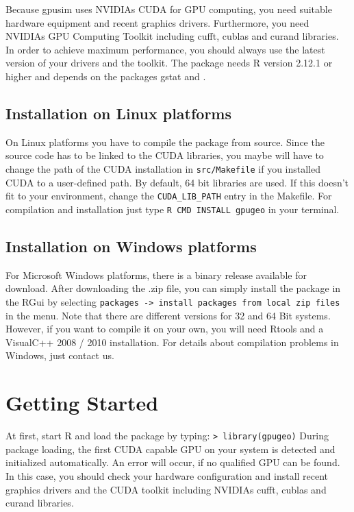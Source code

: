\documentclass[12pt,oneside,a4paper]{article}
\begin{document}
Because gpusim uses NVIDIAs CUDA for GPU computing, you need suitable hardware equipment and recent graphics drivers. 
Furthermore, you need NVIDIAs GPU Computing Toolkit including cufft, cublas and curand libraries. In order to achieve maximum performance, you should always use the latest version of your drivers and the toolkit.
The package needs R version 2.12.1 or higher and depends on the packages gstat \cite{pkg:gstat} and \cite{pkg:fields}. 



\subsection{Installation on Linux platforms}
On Linux platforms you have to compile the package from source. Since the source code has to be linked to the CUDA libraries, you maybe will have to change the path of the CUDA installation in \verb|src/Makefile| if you installed CUDA to a user-defined path. By default, 64 bit libraries are used. If this doesn't fit to your environment, change the \verb|CUDA_LIB_PATH| entry in the Makefile. 
For compilation and installation just type \verb|R CMD INSTALL gpugeo| in your terminal. 




\subsection{Installation on Windows platforms}
For Microsoft Windows platforms, there is a binary release available for download. After downloading the .zip file, you can simply install the package in the RGui by selecting \verb|packages -> install packages from local zip files| in the menu. 
Note that there are different versions for 32 and 64 Bit systems. However, if you want to compile it on your own, you will need Rtools and a VisualC++ 2008 / 2010 installation. For details about compilation problems in Windows, just contact us.








\section{Getting Started}
At first,  start R and load the package by typing:
\verb|> library(gpugeo)|
During package loading, the first CUDA capable GPU on your system is detected and initialized automatically. An error will occur, if no qualified GPU can be found. In this case, you should check your hardware configuration and install recent graphics drivers and the CUDA toolkit including NVIDIAs cufft, cublas and curand libraries.
 
\end{document}

